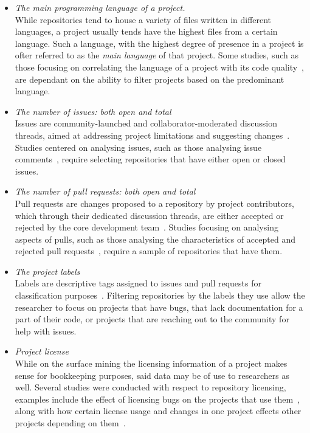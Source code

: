 \begin{itemize}
    \item \textit{The main programming language of a project.}
    \\While repositories tend to house a variety of files written in different languages, a project usually tends have the highest files from a certain language. Such a language, with the highest degree of presence in a project is ofter referred to as the \textit{main language} of that project. Some studies, such as those focusing on correlating the language of a project with its code quality~\cite{QUALITY}, are dependant on the ability to filter projects based on the predominant language.
    \item \textit{The number of issues: both open and total}
    \\Issues are community-launched and collaborator-moderated discussion threads, aimed at addressing project limitations and suggesting changes~\cite{GITHUBHELP}. Studies centered on analysing issues, such as those analysing issue comments~\cite{ISSUES}, require selecting repositories that have either open or closed issues.
    \item \textit{The number of pull requests: both open and total}
    \\Pull requests are changes proposed to a repository by project contributors, which through their dedicated discussion threads, are either accepted or rejected by the core development team~\cite{GITHUBHELP}. Studies focusing on analysing aspects of pulls, such as those analysing the characteristics of accepted and rejected pull requests~\cite{PULLS}, require a sample of repositories that have them.
    \item \textit{The project labels}
    \\Labels are descriptive tags assigned to issues and pull requests for classification purposes~\cite{LABELS}. Filtering repositories by the labels they use allow the researcher to focus on projects that have bugs, that lack documentation for a part of their code, or projects that are reaching out to the community for help with issues.
    \item \textit{Project license}
    \\While on the surface mining the licensing information of a project makes sense for bookkeeping purposes, said data may be of use to researchers as well. Several studies were conducted with respect to repository licensing, examples include the effect of licensing bugs on the projects that use them~\cite{LICENSEBUGS}, along with how certain license usage and changes in one project effects other projects depending on them~\cite{LICENSECHANGE}.

\end{itemize}
